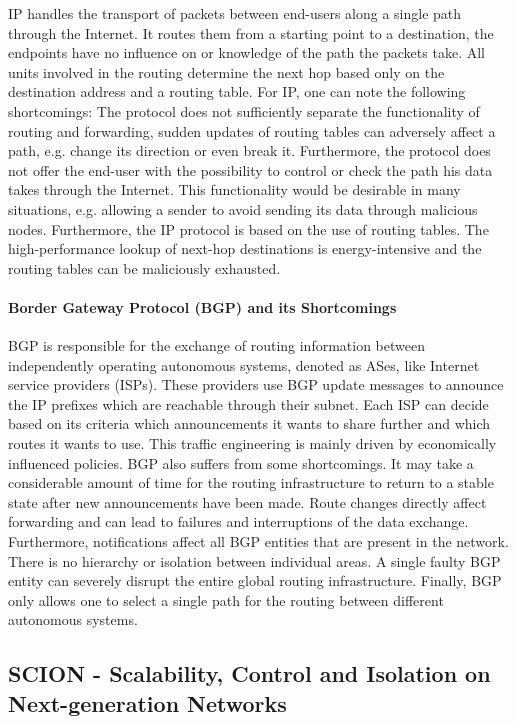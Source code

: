 IP handles the transport of packets between end-users along a single path through the Internet. It routes them from a starting point to a destination, the endpoints have no influence on or knowledge of the path the packets take. All units involved in the routing determine the next hop based only on the destination address and a routing table. For IP, one can note the following shortcomings: The protocol does not sufficiently separate the functionality of routing and forwarding, sudden updates of routing tables can adversely affect a path, e.g. change its direction or even break it. Furthermore, the protocol does not offer the end-user with the possibility to control or check the path his data takes through the Internet. This functionality would be desirable in many situations, e.g. allowing a sender to avoid sending its data through malicious nodes. Furthermore, the IP protocol is based on the use of routing tables. The high-performance lookup of next-hop destinations is energy-intensive and the routing tables can be maliciously exhausted.

\paragraph{Border Gateway Protocol (BGP) and its Shortcomings}

BGP is responsible for the exchange of routing information between independently operating autonomous systems, denoted as ASes, like Internet service providers (ISPs). These providers use BGP update messages to announce the IP prefixes which are reachable through their subnet. Each ISP can decide based on its criteria which announcements it wants to share further and which routes it wants to use. This traffic engineering is mainly driven by economically influenced policies. BGP also suffers from some shortcomings. It may take a considerable amount of time for the routing infrastructure to return to a stable state after new announcements have been made. Route changes directly affect forwarding and can lead to failures and interruptions of the data exchange. Furthermore, notifications affect all BGP entities that are present in the network. There is no hierarchy or isolation between individual areas. A single faulty BGP entity can severely disrupt the entire global routing infrastructure. Finally, BGP only allows one to select a single path for the routing between different autonomous systems. 

\subsection*{SCION - Scalability, Control and Isolation on Next-generation Networks}


